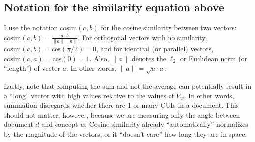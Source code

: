 \documentclass{article}
\begin{document}
\subsection*{Notation for the similarity equation above}

I use the notation $\mathrm{cosim}(a, b)$ for the cosine similarity between two
vectors: $\mathrm{cosim}(a,b) = \frac{a \cdot b}{\|a\| \|b\|}$. For
orthogonal vectors with no similarity, $\mathrm{cosim}(a,b) =
\mathrm{cos}(\pi / 2) = 0$, and for identical (or parallel) vectors,
$\mathrm{cosim}(a,a) = \mathrm{cos}(0) = 1$. Also, $ \| a \| $ denotes
the $\ell_2$ or Euclidean norm (or ``length'') of vector $a$. In other
words, $ \| a \| = \sqrt{a \cdot a}$.

Lastly, note that computing the sum and not the average can
potentially result in a ``long'' vector with high values relative to
the values of $V_w$. In other words, summation disregards whether
there are 1 or many CUIs in a document. This should not matter,
however, because we are measuring only the angle between document $d$
and concept $w$. Cosine similarity already ``automatically''
normalizes by the magnitude of the vectors, or it ``doesn't care'' how
long they are in space.
\end{document}
